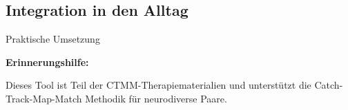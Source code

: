 \subsection{Integration in den Alltag}

\begin{ctmmGreenBox}{Praktische Umsetzung}



\textbf{Erinnerungshilfe:} 
\end{ctmmGreenBox}

\textcolor{ctmmGray}{\small Dieses Tool ist Teil der CTMM-Therapiematerialien und unterstützt die Catch-Track-Map-Match Methodik für neurodiverse Paare.}
